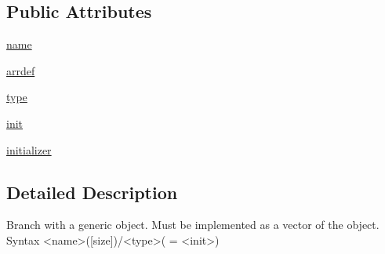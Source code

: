 \subsection*{Public Attributes}
\begin{DoxyCompactItemize}
\item 
\hyperlink{classpanda_1_1generic_1_1GenericBranch_a67787f70dcd4b21e1694f6b5981895a2}{name}
\item 
\hyperlink{classpanda_1_1generic_1_1GenericBranch_a0c081c0cc2d865b9538a505d88c33259}{arrdef}
\item 
\hyperlink{classpanda_1_1generic_1_1GenericBranch_a55d3aa899288fd6bacfc3817276d9854}{type}
\item 
\hyperlink{classpanda_1_1generic_1_1GenericBranch_a4f56965abff61bfcd36da19d812d255e}{init}
\item 
\hyperlink{classpanda_1_1generic_1_1GenericBranch_aa44dcd49b1acf18f2b5791cd3b345add}{initializer}
\end{DoxyCompactItemize}


\subsection{Detailed Description}
\begin{DoxyVerb}
Branch with a generic object. Must be implemented as a vector of the object.
Syntax
<name>([size])/<type>( = <init>)
\end{DoxyVerb}
 

